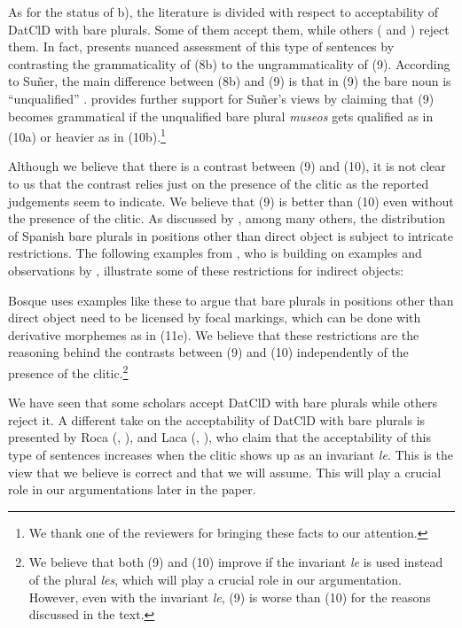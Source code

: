 \documentclass[output=paper,colorlinks,citecolor=brown,
]{langscibook}
\begin{document}
As for the status of b), the literature is divided with respect to acceptability of DatClD with bare plurals. Some of them \citep{suñer1988} accept them, while others (\citealt{jaeggli1982} and \citealt{fernandez1989reccion}) reject them. In fact, \citet{suñer1988} presents nuanced assessment of this type of sentences by contrasting the grammaticality of (8b) to the ungrammaticality of (9). According to Suñer, the main difference between (8b) and (9) is that in (9) the bare noun is “unqualified” \citep[395, fn6]{suñer1988}. \citet[43-44]{cuervo2003datives} provides further support for Suñer’s views by claiming that (9) becomes grammatical if the unqualified bare plural \textit{museos} gets qualified as in (10a) or heavier as in (10b).\footnote{\textrm{ We thank one of the reviewers for bringing these facts to our attention.}}




Although we believe that there is a contrast between (9) and (10), it is not clear to us that the contrast relies just on the presence of the clitic as the reported judgements seem to indicate. We believe that (9) is better than (10) even without the presence of the clitic. As discussed by \citet{bosque1996que}, among many others, the distribution of Spanish bare plurals in positions other than direct object is subject to intricate restrictions. The following examples from \citet{bosque1996que}, who is building on examples and observations by \citet{laca1997sustantivos}, illustrate some of these restrictions for indirect objects:




Bosque uses examples like these to argue that bare plurals in positions other than direct object need to be licensed by focal markings, which can be done with derivative morphemes as in (11e). We believe that these restrictions are the reasoning behind the contrasts between (9) and (10) independently of the presence of the clitic.\footnote{\textrm{ We believe that both (9) and (10) improve if the invariant }\textrm{\textit{le}}\textrm{ is used instead of the plural }\textrm{\textit{les}}\textrm{, which will play a crucial role in our argumentation. However, even with the invariant }\textrm{\textit{le}}\textrm{, (9) is worse than (10) for the reasons discussed in the text. }}

We have seen that some scholars accept DatClD with bare plurals while others reject it. A different take on the acceptability of DatClD with bare plurals is presented by Roca (\citeyear{roca1992}, \citeyear{roca1996}), and Laca (\citeyear{laca1997sustantivos}, \citeyear{laca1999}), who claim that the acceptability of this type of sentences increases when the clitic shows up as an invariant \textit{le}. This is the view that we believe is correct and that we will assume. This will play a crucial role in our argumentations later in the paper. 
\end{document}
